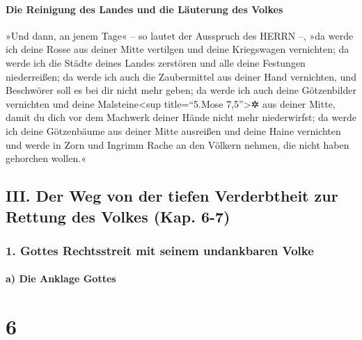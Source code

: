 \hypertarget{die-reinigung-des-landes-und-die-luxe4uterung-des-volkes}{%
\paragraph{Die Reinigung des Landes und die Läuterung des
Volkes}\label{die-reinigung-des-landes-und-die-luxe4uterung-des-volkes}}

»Und dann, an jenem Tage« -- so lautet der Ausspruch des
HERRN --, »da werde ich deine Rosse aus deiner Mitte vertilgen und deine
Kriegswagen vernichten; da werde ich die Städte deines
Landes zerstören und alle deine Festungen niederreißen;
da werde ich auch die Zaubermittel aus deiner Hand
vernichten, und Beschwörer soll es bei dir nicht mehr geben;
da werde ich auch deine Götzenbilder vernichten und deine
Malsteine\textless sup title=``5.Mose 7,5''\textgreater✲ aus deiner
Mitte, damit du dich vor dem Machwerk deiner Hände nicht mehr
niederwirfst; da werde ich deine Götzenbäume aus deiner
Mitte ausreißen und deine Haine vernichten und werde in
Zorn und Ingrimm Rache an den Völkern nehmen, die nicht haben gehorchen
wollen.«

\hypertarget{iii.-der-weg-von-der-tiefen-verderbtheit-zur-rettung-des-volkes-kap.-6-7}{%
\subsection{III. Der Weg von der tiefen Verderbtheit zur Rettung des
Volkes (Kap.
6-7)}\label{iii.-der-weg-von-der-tiefen-verderbtheit-zur-rettung-des-volkes-kap.-6-7}}

\hypertarget{gottes-rechtsstreit-mit-seinem-undankbaren-volke}{%
\subsubsection{1. Gottes Rechtsstreit mit seinem undankbaren
Volke}\label{gottes-rechtsstreit-mit-seinem-undankbaren-volke}}

\hypertarget{a-die-anklage-gottes}{%
\paragraph{a) Die Anklage Gottes}\label{a-die-anklage-gottes}}

\hypertarget{section-5}{%
\section{6}\label{section-5}}

